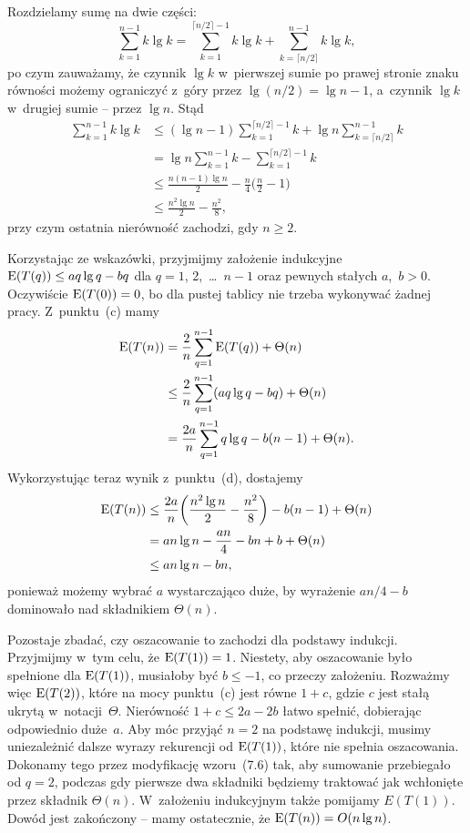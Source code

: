 \subproblem %
Rozdzielamy sumę na dwie części:
\[
	\sum_{k=1}^{n-1}k\lg k = \sum_{k=1}^{\lceil n/2\rceil-1}k\lg k+\sum_{k=\lceil n/2\rceil}^{n-1}k\lg k,
\]
po czym zauważamy, że czynnik $\lg k$ w~pierwszej sumie po prawej stronie znaku równości możemy ograniczyć z~góry przez $\lg(n/2)=\lg n-1$, a~czynnik $\lg k$ w~drugiej sumie -- przez $\lg n$. Stąd
\begin{align*}
	\sum_{k=1}^{n-1}k\lg k &\le (\lg n-1)\sum_{k=1}^{\lceil n/2\rceil-1}k+\lg n\sum_{k=\lceil n/2\rceil}^{n-1}k \\
	&= \lg n\sum_{k=1}^{n-1}k-\sum_{k=1}^{\lceil n/2\rceil-1}k \\[2mm]
	&\le \frac{n(n-1)\lg n}{2}-\frac{n}{4}\biggl(\frac{n}{2}-1\biggr) \\[1mm]
	&\le \frac{n^2\lg n}{2}-\frac{n^2}{8},
\end{align*}
przy czym ostatnia nierówność zachodzi, gdy $n\ge2$.

\subproblem %
Korzystając ze wskazówki, przyjmijmy założenie indukcyjne $\operatorname{E}(T(q))\le aq\lg q-bq$ dla $q=1$, 2,~\dots~$n-1$ oraz pewnych stałych $a$,~$b>0$. Oczywiście $\operatorname{E}(T(0))=0$, bo dla pustej tablicy nie trzeba wykonywać żadnej pracy. Z~punktu~(c) mamy
\begin{align*}
	\operatorname{E}(T(n)) &= \frac{2}{n}\sum_{q=1}^{n-1}\operatorname{E}(T(q))+\Theta(n) \\
	&\le \frac{2}{n}\sum_{q=1}^{n-1}(aq\lg q-bq)+\Theta(n) \\
	&= \frac{2a}{n}\sum_{q=1}^{n-1}q\lg q-b(n-1)+\Theta(n).
\end{align*}
Wykorzystując teraz wynik z~punktu~(d), dostajemy
\begin{align*}
	\operatorname{E}(T(n)) &\le \frac{2a}{n}\biggl(\frac{n^2\lg n}{2}-\frac{n^2}{8}\biggr)-b(n-1)+\Theta(n) \\
	&= an\lg n-\frac{an}{4}-bn+b+\Theta(n) \\
	&\le an\lg n-bn,
\end{align*}
ponieważ możemy wybrać $a$ wystarczająco duże, by wyrażenie $an/4-b$ dominowało nad składnikiem $\Theta(n)$.

Pozostaje zbadać, czy oszacowanie to zachodzi dla podstawy indukcji. Przyjmijmy w~tym celu, że $\operatorname{E}(T(1))=1$. Niestety, aby oszacowanie było spełnione dla $\operatorname{E}(T(1))$, musiałoby być $b\le-1$, co przeczy założeniu. Rozważmy więc $\operatorname{E}(T(2))$, które na mocy punktu~(c) jest równe $1+c$, gdzie $c$ jest stałą ukrytą w~notacji~$\Theta$. Nierówność $1+c\le2a-2b$ łatwo spełnić, dobierając odpowiednio duże~$a$. Aby móc przyjąć $n=2$ na podstawę indukcji, musimy uniezależnić dalsze wyrazy rekurencji od $\operatorname{E}(T(1))$, które nie spełnia oszacowania. Dokonamy tego przez modyfikację wzoru~(7.6) tak, aby sumowanie przebiegało od $q=2$, podczas gdy pierwsze dwa składniki będziemy traktować jak wchłonięte przez składnik $\Theta(n)$. W~założeniu indukcyjnym także pomijamy $E(T(1))$. Dowód jest zakończony -- mamy ostatecznie, że $\operatorname{E}(T(n))=O(n\lg n)$.


